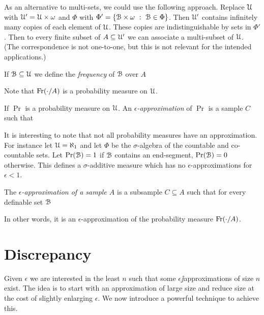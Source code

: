 \documentclass[sputnik.tex]{subfiles}
\begin{document}
As an alternative to multi-sets, we could use the following approach. Replace $\EuScript U$ with $\EuScript U'=\EuScript U\times\omega$ and $\Phi$ with $\Phi'=\{\B\times\omega\ :\ \B\in\Phi\}$. Then $\EuScript U'$ contains infinitely many copies of each element of $\EuScript U$. These copies are indistinguishable by sets in $\Phi'$. Then to every finite subset of $A\subseteq\EuScript U'$ we can associate a multi-subset of $\EuScript U$. (The correspondence is not one-to-one, but this is not relevant for the intended applications.)


If $\EuScript B\subseteq\EuScript U$ we define the \emph{frequency\/} of $\EuScript B$ over $A$


Note that $\mathop{\rm Fr}(\cdot/A)$ is a probability measure on $\EuScript U$.

If $\Pr$ is a probability measure on $\EuScript U$. An \emph{$\epsilon$-approximation\/} of $\Pr$ is a sample $C$ such that  


It is interesting to note that not all probability measures have an approximation. For instance let $\EuScript U=\aleph_1$ and let $\Phi$ be the $\sigma$-algebra of the countable and co-countable sets. Let $\Pr(\EuScript B)=1$ if $\EuScript B$ contains an end-segment, $\Pr(\EuScript B)=0$ otherwise. This defines a $\sigma$-additive measure which has no $\epsilon$-approximations for $\epsilon<1$. 

The \emph{$\epsilon$-approximation of a sample $A$\/} is a subsample $C\subseteq A$ such that for every definable set $\EuScript B$


In other words, it is an $\epsilon$-approximation of the probability measure  $\mathop{\rm Fr}(\cdot/A)$.

\section{Discrepancy}\label{epsilon_approximations}

Given $\epsilon$ we are interested in the least $n$ such that some $\epsilon\jj$approximations of size $n$ exist.
The idea is to start with an approximation of large size and reduce size at the cost of slightly enlarging $\epsilon$.
We now introduce a powerful technique to achieve this.
\end{document}
